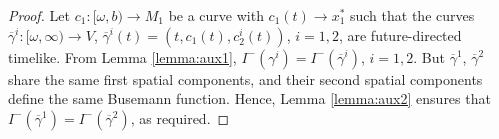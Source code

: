 \begin{proof}
Let $c_1:[\omega,b)\rightarrow M_1$ be a curve with $c_1(t)\rightarrow x_1^*$ such that the curves $\overline{\gamma}^i:[\omega,\infty)\rightarrow V$, $\overline{\gamma}^i(t)=(t,c_1(t),c_2^i(t))$, $i=1,2$, are future-directed timelike. From Lemma \ref{lemma:aux1}, $I^-(\gamma^i)=I^-(\overline{\gamma}^i)$, $i=1,2$. But $\overline{\gamma}^1$, $\overline{\gamma}^2$ share the same first spatial components, and their second spatial components define the same Busemann function. Hence, Lemma \ref{lemma:aux2} ensures that $I^-(\overline{\gamma}^1)=I^-(\overline{\gamma}^2)$, as required.
\end{proof}

%

